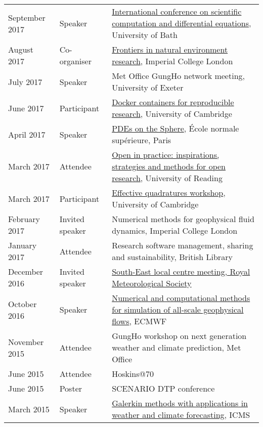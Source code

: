 \documentclass[a4paper,11pt]{article}
\begin{document}
\begin{tabularx}{\linewidth}{l l X}
September 2017 & Speaker & \href{https://sites.google.com/site/scicade2017/}{International conference on scientific computation and differential equations}, University of Bath \\
August 2017 & Co-organiser & \href{https://frontiers2017.wordpress.com/}{Frontiers in natural environment research}, Imperial College London \\
July 2017 & Speaker & Met Office GungHo network meeting, University of Exeter \\
June 2017 & Participant & \href{https://www.software.ac.uk/c4rr}{Docker containers for reproducible research}, University of Cambridge \\
April 2017 & Speaker & \href{https://forge.ipsl.jussieu.fr/heat/wiki/PDEs2017}{PDEs on the Sphere}, École normale supérieure, Paris \\
March 2017 & Attendee & \href{https://blogs.reading.ac.uk/open-research/open-in-practice-inspirations-strategies-and-methods-for-open-research/}{Open in practice: inspirations, strategies and methods for open research}, University of Reading \\
March 2017 & Participant & \href{http://www.effective-quadratures.org/eq2017}{Effective quadratures workshop}, University of Cambridge \\
February 2017 & Invited speaker & Numerical methods for geophysical fluid dynamics, Imperial College London \\
January 2017 & Attendee & Research software management, sharing and sustainability, British Library \\
December 2016 & Invited speaker & \href{https://www.rmets.org/events/meteorological-research-within-university-reading-2016}{South-East local centre meeting, Royal Meteorological Society} \\
October 2016 & Speaker & \href{http://www.ecmwf.int/en/learning/workshops-and-seminars/workshop-numerical-and-computational-methods-simulation-all-scale-geophysical-flows}{Numerical and computational methods for simulation of all-scale geophysical flows}, ECMWF \\
November 2015 & Attendee & GungHo workshop on next generation weather and climate prediction, Met Office \\
June 2015 & Attendee & Hoskins@70 \\
June 2015 & Poster & SCENARIO DTP conference \\
March 2015 & Speaker & \href{http://www.icms.org.uk/workshop.php?id=334}{Galerkin methods with applications in weather and climate forecasting}, ICMS \\
\end{tabularx}
\end{document}
